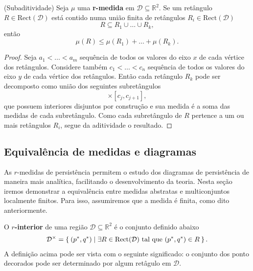 \begin{propo}{(Subaditividade)} 
    Seja $\mu$ uma \textbf{r-medida} em $\mathcal{D} \subseteq \mathbb{R}^2$. Se um retângulo $R \in 
    \text{Rect}(\mathcal{D})$ está contido numa união finita de retângulos $R_i \in \text{Rect}(
    \mathcal{D})$
    \begin{equation*}
        R \subseteq R_1 \cup \dots \cup R_k,
    \end{equation*}
    então
    \begin{equation*}
        \mu(R) \leq \mu(R_1) + \dots + \mu(R_k).
    \end{equation*}
\end{propo}
\begin{proof}
    Seja $a_1 < \dots < a_m$ sequência de todos os valores do eixo $x$ de cada vértice dos retângulos. 
    Considere também $c_1 < \dots < c_n$ sequência de todos os valores do eixo $y$ de cada vértice dos retângulos.
    Então cada retângulo $R_k$ pode ser decomposto como união dos seguintes subretângulos
    \begin{equation*}
        [a_i, a_{i+1}] \times [c_j, c_{j+1}],
    \end{equation*}
    que possuem interiores disjuntos por construção e sua medida é a soma das medidas de cada subretângulo. 
    Como cada subretângulo de $R$ pertence a um ou mais retângulos $R_i$, segue da aditividade o resultado.
\end{proof}

\subsection{Equivalência de medidas e diagramas}
As $r$-medidas de persistência permitem o estudo dos diagramas de persistência de maneira mais analítica,
facilitando o desenvolvimento da teoria. Nesta seção iremos demonstrar a equivalência entre medidas 
abstratas e multiconjuntos localmente finitos. Para isso, assumiremos que a medida é finita, como dito
anteriormente. 

O \textbf{$r$-interior} de uma região $\mathcal{D} \subseteq \mathbb{R}^2$ é o conjunto definido abaixo
\begin{equation*}
    \mathcal{D}^\times = \Set{(p^*, q^*) | \exists R \in \text{Rect}(\mathcal{D}) \text{ tal que }
    (p^*, q^*) \in R}.
\end{equation*}
A definição acima pode ser vista com o seguinte significado: o conjunto dos ponto decorados pode ser 
determinado por algum retâgulo em $\mathcal{D}$. 

